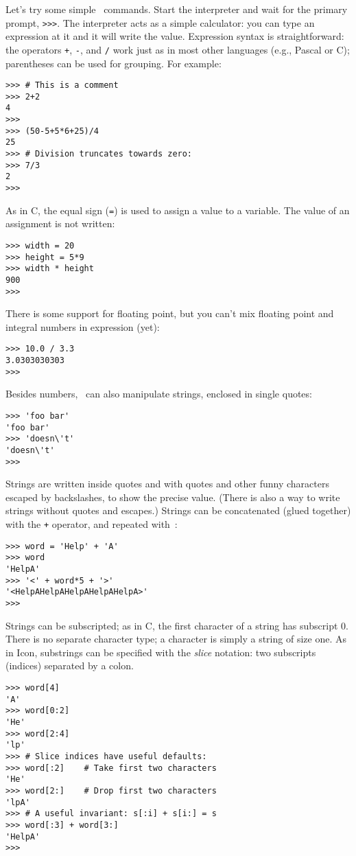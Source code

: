 Let's try some simple \Python\ commands.
Start the interpreter and wait for the primary prompt,
{\tt >>>}.
The interpreter acts as a simple calculator: you can type an expression
at it and it will write the value.
Expression syntax is straightforward: the operators
{\tt +},
{\tt -},
{\tt *}
and
{\tt /}
work just as in most other languages (e.g., Pascal or C); parentheses
can be used for grouping.
For example:
\bcode\begin{verbatim}
>>> # This is a comment
>>> 2+2
4
>>>
>>> (50-5+5*6+25)/4
25
>>> # Division truncates towards zero:
>>> 7/3
2
>>>
\end{verbatim}\ecode
As in C, the equal sign ({\tt =}) is used to assign a value to a variable.
The value of an assignment is not written:
\bcode\begin{verbatim}
>>> width = 20
>>> height = 5*9
>>> width * height
900
>>>
\end{verbatim}\ecode
There is some support for floating point, but you can't mix floating
point and integral numbers in expression (yet):
\bcode\begin{verbatim}
>>> 10.0 / 3.3
3.0303030303
>>>
\end{verbatim}\ecode
Besides numbers, \Python\ can also manipulate strings, enclosed in single
quotes:
\bcode\begin{verbatim}
>>> 'foo bar'
'foo bar'
>>> 'doesn\'t'
'doesn\'t'
>>>
\end{verbatim}\ecode
Strings are written inside quotes and with quotes and other funny
characters escaped by backslashes, to show the precise value.
(There is also a way to write strings without quotes and escapes.)
Strings can be concatenated (glued together) with the
{\tt +}
operator, and repeated with~{\tt *}:
\bcode\begin{verbatim}
>>> word = 'Help' + 'A'
>>> word
'HelpA'
>>> '<' + word*5 + '>'
'<HelpAHelpAHelpAHelpAHelpA>'
>>>
\end{verbatim}\ecode
Strings can be subscripted; as in C, the first character of a string has
subscript 0.
There is no separate character type; a character is simply a string of
size one.
As in Icon, substrings can be specified with the
{\em slice}
notation: two subscripts (indices) separated by a colon.
\bcode\begin{verbatim}
>>> word[4]
'A'
>>> word[0:2]
'He'
>>> word[2:4]
'lp'
>>> # Slice indices have useful defaults:
>>> word[:2]    # Take first two characters
'He'
>>> word[2:]    # Drop first two characters
'lpA'
>>> # A useful invariant: s[:i] + s[i:] = s
>>> word[:3] + word[3:]
'HelpA'
>>>
\end{verbatim}\ecode
